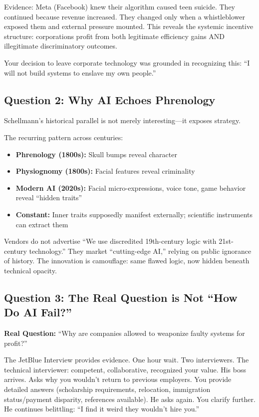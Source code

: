 \documentclass[11pt,twoside]{article}
\begin{document}
Evidence: Meta (Facebook) knew their algorithm caused teen suicide. They continued because revenue increased. They changed only when a whistleblower exposed them and external pressure mounted. This reveals the systemic incentive structure: corporations profit from both legitimate efficiency gains AND illegitimate discriminatory outcomes.

Your decision to leave corporate technology was grounded in recognizing this: ``I will not build systems to enslave my own people.''

\subsection{Question 2: Why AI Echoes Phrenology}

Schellmann's historical parallel is not merely interesting---it exposes strategy.

The recurring pattern across centuries:
\begin{itemize}
\item \textbf{Phrenology (1800s):} Skull bumps reveal character
\item \textbf{Physiognomy (1800s):} Facial features reveal criminality
\item \textbf{Modern AI (2020s):} Facial micro-expressions, voice tone, game behavior reveal ``hidden traits''
\item \textbf{Constant:} Inner traits supposedly manifest externally; scientific instruments can extract them
\end{itemize}

Vendors do not advertise ``We use discredited 19th-century logic with 21st-century technology.'' They market ``cutting-edge AI,'' relying on public ignorance of history. The innovation is camouflage: same flawed logic, now hidden beneath technical opacity.

\subsection{Question 3: The Real Question is Not ``How Do AI Fail?''}

\textbf{Real Question:} ``Why are companies allowed to weaponize faulty systems for profit?''

The JetBlue Interview provides evidence. One hour wait. Two interviewers. The technical interviewer: competent, collaborative, recognized your value. His boss arrives. Asks why you wouldn't return to previous employers. You provide detailed answers (scholarship requirements, relocation, immigration status/payment disparity, references available). He asks again. You clarify further. He continues belittling: ``I find it weird they wouldn't hire you.''
\end{document}
